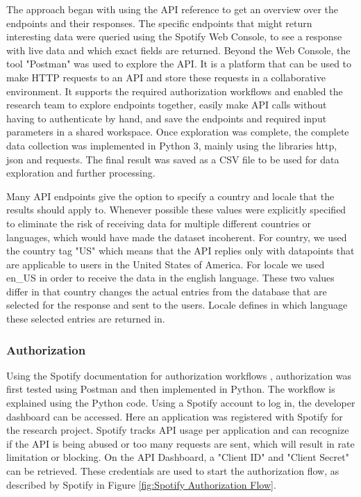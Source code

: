 The approach began with using the \ac{API} reference to get an overview over the endpoints and their responses.
The specific endpoints that might return interesting data were queried using the Spotify Web Console, to see
a response with live data and which exact fields are returned.
Beyond the Web Console, the tool "Postman" was used to explore the \ac{API}.
It is a platform that can be used to make HTTP requests to an API and store these requests in
a collaborative environment. \cite{PostmanWhatIs} It supports the required authorization workflows
and enabled the research team to explore endpoints together, easily make \ac{API} calls without having to
authenticate by hand, and save the endpoints and required input parameters in a shared workspace.
Once exploration was complete, the complete data collection was implemented in Python 3, mainly using the
libraries http, json and requests. The final result was saved as a CSV file to be used for data exploration
and further processing.

Many API endpoints give the option to specify a country and locale that the results should apply to.
Whenever possible these values were explicitly specified to eliminate the risk of receiving data for multiple different
countries or languages, which would have made the dataset incoherent.
For country, we used the country tag "US" which means that the API replies only with datapoints that are applicable
to users in the United States of America.
For locale we used en\_US in order to receive the data in the english language.
These two values differ in that country changes the actual entries from the database that are selected for the response
and sent to the users. Locale defines in which language these selected entries are returned in.

\subsubsection{Authorization}

Using the Spotify documentation for authorization workflows \cite{SpotifyAuth}, authorization was first tested
using Postman and then implemented in Python.
The workflow is explained using the Python code.
Using a Spotify account to log in, the developer dashboard can be accessed. Here an application was registered with
Spotify for the research project. Spotify tracks \ac{API} usage per application and can recognize if the API is
being abused or too many requests are sent, which will result in rate limitation or blocking.
On the API Dashboard, a "Client ID" and "Client Secret" can be retrieved. These credentials are used to start
the authorization flow, as described by Spotify in Figure \ref{fig:Spotify Authorization Flow}.


